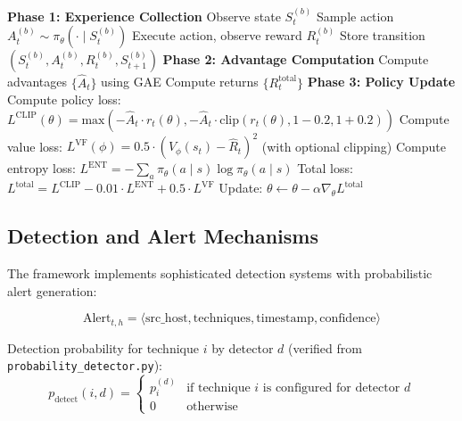 \documentclass[12pt,twoside]{article}
\begin{document}
\begin{algorithm}
\caption{PPO Training for Blue Agent (Verified Implementation)}
\begin{algorithmic}[1]
\STATE \textbf{Phase 1: Experience Collection}
        \STATE Observe state $S_t^{(b)}$
        \STATE Sample action $A_t^{(b)} \sim \pi_\theta(\cdot \mid S_t^{(b)})$
        \STATE Execute action, observe reward $R_t^{(b)}$
        \STATE Store transition $(S_t^{(b)}, A_t^{(b)}, R_t^{(b)}, S_{t+1}^{(b)})$
    \ENDFOR
\ENDFOR
\STATE \textbf{Phase 2: Advantage Computation}
\STATE Compute advantages $\{\hat{A}_t\}$ using GAE
\STATE Compute returns $\{R_t^{\text{total}}\}$
\STATE \textbf{Phase 3: Policy Update}
        \STATE Compute policy loss: $L^{\text{CLIP}}(\theta) = \text{max}(-\hat{A}_t \cdot r_t(\theta), -\hat{A}_t \cdot \text{clip}(r_t(\theta), 1-0.2, 1+0.2))$
        \STATE Compute value loss: $L^{\text{VF}}(\phi) = 0.5 \cdot (V_\phi(s_t) - \hat{R}_t)^2$ (with optional clipping)
        \STATE Compute entropy loss: $L^{\text{ENT}} = -\sum_a \pi_\theta(a \mid s) \log \pi_\theta(a \mid s)$
        \STATE Total loss: $L^{\text{total}} = L^{\text{CLIP}} - 0.01 \cdot L^{\text{ENT}} + 0.5 \cdot L^{\text{VF}}$
        \STATE Update: $\theta \leftarrow \theta - \alpha \nabla_\theta L^{\text{total}}$
    \ENDFOR
\ENDFOR
\end{algorithmic}
\end{algorithm}

\subsection{Detection and Alert Mechanisms}

The framework implements sophisticated detection systems with probabilistic alert generation:

\begin{equation}
\text{Alert}_{t,h} = \langle \text{src\_host}, \text{techniques}, \text{timestamp}, \text{confidence} \rangle
\end{equation}

Detection probability for technique $i$ by detector $d$ (verified from \texttt{probability\_detector.py}):
\begin{equation}
p_{\text{detect}}(i, d) = \begin{cases}
p_i^{(d)} & \text{if technique } i \text{ is configured for detector } d \\
0 & \text{otherwise}
\end{cases}
\end{equation}
\end{document}
